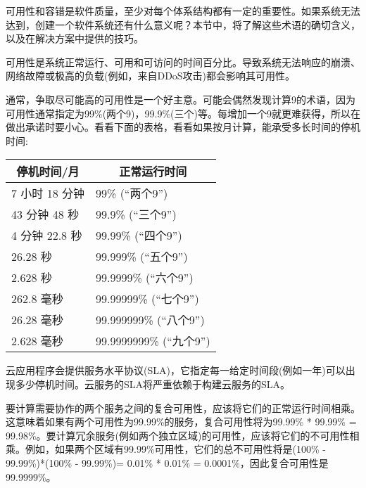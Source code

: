 
可用性和容错是软件质量，至少对每个体系结构都有一定的重要性。如果系统无法达到，创建一个软件系统还有什么意义呢？本节中，将了解这些术语的确切含义，以及在解决方案中提供的技巧。


可用性是系统正常运行、可用和可访问的时间百分比。导致系统无法响应的崩溃、网络故障或极高的负载(例如，来自DDoS攻击)都会影响其可用性。

通常，争取尽可能高的可用性是一个好主意。可能会偶然发现计算9的术语，因为可用性通常指定为99\%(两个9)，99.9\%(三个)等。每增加一个9就更难获得，所以在做出承诺时要小心。看看下面的表格，看看如果按月计算，能承受多长时间的停机时间:

\begin{table}[H]
	\begin{tabular}{|l|l|}
		\hline
		\multicolumn{1}{|c|}{\textbf{停机时间/月}} & \multicolumn{1}{c|}{\textbf{正常运行时间}} \\ \hline
		7 小时 18 分钟                            & 99\% (“两个9”)                   \\ \hline
		43 分钟 48 秒                         & 99.9\% (“三个9”)               \\ \hline
		4 分钟 22.8 秒                        & 99.99\% (“四个9”)               \\ \hline
		26.28 秒                                 & 99.999\% (“五个9”)              \\ \hline
		2.628 秒                                 & 99.9999\% (“六个9”)              \\ \hline
		262.8 毫秒                                      & 99.99999\% (“七个9”)           \\ \hline
		26.28 毫秒                                      & 99.999999\% (“八个9”)          \\ \hline
		2.628 毫秒                                      & 99.9999999\% (“九个9”)          \\ \hline
	\end{tabular}
\end{table}

云应用程序会提供服务水平协议(SLA)，它指定每一给定时间段(例如一年)可以出现多少停机时间。云服务的SLA将严重依赖于构建云服务的SLA。

要计算需要协作的两个服务之间的复合可用性，应该将它们的正常运行时间相乘。这意味着如果有两个可用性为99.99\%的服务，复合可用性将为99.99\% * 99.99\% = 99.98\%。要计算冗余服务(例如两个独立区域)的可用性，应该将它们的不可用性相乘。例如，如果两个区域有99.99\%可用性，它们的总不可用性将是(100\% - 99.99\%)*(100\% - 99.99\%)= 0.01\% * 0.01\% = 0.0001\%，因此复合可用性是99.9999\%。

